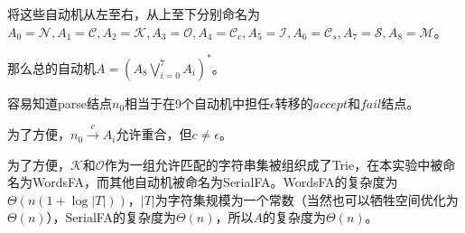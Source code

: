 \documentclass[UTF8]{ctexart}
\begin{document}
\par 将这些自动机从左至右，从上至下分别命名为$A_0=\mathcal{N}, A_1=\mathcal{C}, A_2=\mathcal{K}, A_3=\mathcal{O}, A_4=\mathcal{C}_{c},A_5=\mathcal{I}, A_6=\mathcal{C}_{s},A_7=\mathcal{S},A_8=\mathcal{M} $。
\par 那么总的自动机$A= (A_8\bigvee_{i=0}^7 A_{i})^*$。
\par 容易知道parse结点$n_0$相当于在9个自动机中担任$\epsilon$转移的$accept$和$fail$结点。
\par 为了方便，$n_0\xrightarrow{c}A_i$允许重合，但$c\neq \epsilon$。
\par 为了方便，$\mathcal{K}$和$\mathcal{O}$作为一组允许匹配的字符串集被组织成了Trie，在本实验中被命名为WordsFA，而其他自动机被命名为SerialFA。WordsFA的复杂度为$\Theta(n(1+\log |T|))$，$|T|$为字符集规模为一个常数（当然也可以牺牲空间优化为$\Theta(n)$），SerialFA的复杂度为$\Theta(n)$，所以$A$的复杂度为$\Theta(n)$。
\end{document}
